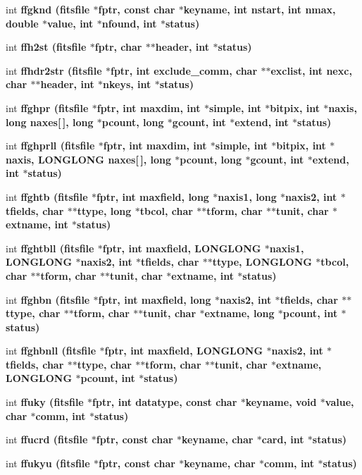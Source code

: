 \begin{CompactItemize}
int \bf{ffgknd} (\bf{fitsfile} $\ast$fptr, const char $\ast$keyname, int nstart, int nmax, double $\ast$value, int $\ast$nfound, int $\ast$status)
\item 
int \bf{ffh2st} (\bf{fitsfile} $\ast$fptr, char $\ast$$\ast$header, int $\ast$status)
\item 
int \bf{ffhdr2str} (\bf{fitsfile} $\ast$fptr, int exclude\_\-comm, char $\ast$$\ast$exclist, int nexc, char $\ast$$\ast$header, int $\ast$nkeys, int $\ast$status)
\item 
int \bf{ffghpr} (\bf{fitsfile} $\ast$fptr, int maxdim, int $\ast$simple, int $\ast$bitpix, int $\ast$naxis, long naxes[$\,$], long $\ast$pcount, long $\ast$gcount, int $\ast$extend, int $\ast$status)
\item 
int \bf{ffghprll} (\bf{fitsfile} $\ast$fptr, int maxdim, int $\ast$simple, int $\ast$bitpix, int $\ast$naxis, \bf{LONGLONG} naxes[$\,$], long $\ast$pcount, long $\ast$gcount, int $\ast$extend, int $\ast$status)
\item 
int \bf{ffghtb} (\bf{fitsfile} $\ast$fptr, int maxfield, long $\ast$naxis1, long $\ast$naxis2, int $\ast$tfields, char $\ast$$\ast$ttype, long $\ast$tbcol, char $\ast$$\ast$tform, char $\ast$$\ast$tunit, char $\ast$extname, int $\ast$status)
\item 
int \bf{ffghtbll} (\bf{fitsfile} $\ast$fptr, int maxfield, \bf{LONGLONG} $\ast$naxis1, \bf{LONGLONG} $\ast$naxis2, int $\ast$tfields, char $\ast$$\ast$ttype, \bf{LONGLONG} $\ast$tbcol, char $\ast$$\ast$tform, char $\ast$$\ast$tunit, char $\ast$extname, int $\ast$status)
\item 
int \bf{ffghbn} (\bf{fitsfile} $\ast$fptr, int maxfield, long $\ast$naxis2, int $\ast$tfields, char $\ast$$\ast$ttype, char $\ast$$\ast$tform, char $\ast$$\ast$tunit, char $\ast$extname, long $\ast$pcount, int $\ast$status)
\item 
int \bf{ffghbnll} (\bf{fitsfile} $\ast$fptr, int maxfield, \bf{LONGLONG} $\ast$naxis2, int $\ast$tfields, char $\ast$$\ast$ttype, char $\ast$$\ast$tform, char $\ast$$\ast$tunit, char $\ast$extname, \bf{LONGLONG} $\ast$pcount, int $\ast$status)
\item 
int \bf{ffuky} (\bf{fitsfile} $\ast$fptr, int \bf{datatype}, const char $\ast$keyname, void $\ast$value, char $\ast$comm, int $\ast$status)
\item 
int \bf{ffucrd} (\bf{fitsfile} $\ast$fptr, const char $\ast$keyname, char $\ast$card, int $\ast$status)
\item 
int \bf{ffukyu} (\bf{fitsfile} $\ast$fptr, const char $\ast$keyname, char $\ast$comm, int $\ast$status)
$$
\end{CompactItemize}
